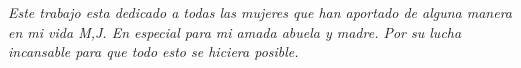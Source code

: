 
\begin{dedication} %

\textit{Este trabajo esta dedicado a todas las mujeres que han aportado de alguna manera en mi vida M,J. En especial para mi amada abuela y madre. Por su lucha incansable para que todo esto se hiciera posible.}

\end{dedication}

